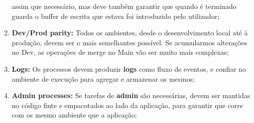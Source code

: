 \documentclass{article}
\begin{document}
\begin{enumerate}
  assim que necessário, mas deve também garantir que quando é terminado guarda o buffer de escrita que
  estava foi introduzido pelo utilizador;
  \item \textbf{Dev/Prod parity:} Todos os ambientes, desde o desenvolvimento
  local até à produção, devem ser o mais semelhantes possível.
  Se acumularmos alterações no Dev, as operações de merge no Main vão ser muito mais complexas;
  \item \textbf{Logs:} Os processos devem produzir \textbf{logs}
  como fluxo de eventos, e confiar no ambiente de execução para
  agregar e armazenar os mesmos;
  \item \textbf{Admin processes:} Se tarefas de \textbf{admin} são necessárias,
  devem ser mantidas no código finte e empacotados ao lado da aplicação,
  para garantir que corre com os mesmo ambiente que a aplicação;
\end{enumerate}
\end{document}

